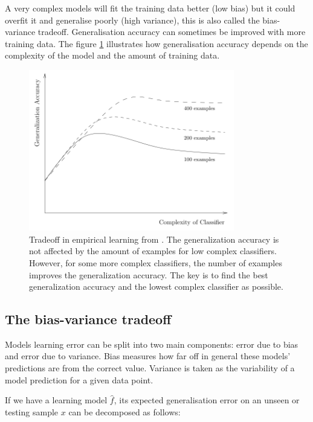 A very complex models will fit the training data better (low bias) but it could
overfit it and generalise poorly (high variance), this is also called the
bias-variance tradeoff.  Generalisation accuracy can sometimes be improved with
more training data. The figure \ref{fig:tradeoff} illustrates how generalisation
accuracy depends on the complexity of the model and the amount of training data.

\begin{figure}[!h]
  \centering
  \includegraphics[width=0.8\textwidth]{img/3tradeoff}
  \caption{Tradeoff in empirical learning from \cite{dietterich2003}. The generalization accuracy is not affected by the amount of examples for low complex classifiers. However, for some more complex classifiers, the number of examples improves the generalization accuracy. The key is to find the best generalization accuracy and the lowest complex classifier as possible. }
  \label{fig:tradeoff}
\end{figure}

\subsection{The bias-variance tradeoff} \label{sec:biasvar}

Models learning error can be split into two main components: error due to bias and error due to variance. Bias measures how far off in general these models' predictions are from the correct value. Variance is taken as the variability of a model prediction for a given data point.

If we have a learning model $\hat{f}$, its expected generalisation error on an unseen or testing sample $x$ can be decomposed as follows:

